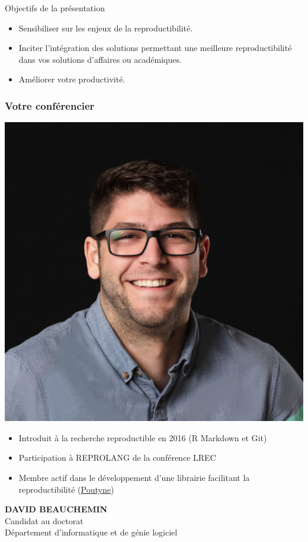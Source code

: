 \documentclass[aspectratio=169,10pt,xcolor=x11names,english,french]{beamer}
\begin{document}
	\begin{frame}{Objectifs de la présentation}
		\begin{itemize}
			\item Sensibiliser sur les enjeux de la reproductibilité.
			\item Inciter l'intégration des solutions permettant une meilleure reproductibilité dans vos solutions d'affaires ou académiques.
			\item Améliorer votre productivité.
		\end{itemize}
	\end{frame}
	
	\begin{frame}
		\frametitle{Votre conférencier}
		
		\begin{minipage}{0.25\linewidth}
			\includegraphics[width=\linewidth,keepaspectratio]{img/david}
		\end{minipage}
		\hfill
		\begin{minipage}{0.70\linewidth}
			\begin{itemize}
				\item Introduit à la recherche reproductible en 2016 (R Markdown et Git)
				\item Participation à REPROLANG de la conférence LREC \cite{garneau2020robust}
				\item Membre actif dans le développement d'une librairie facilitant la reproductibilité (\href{https://poutyne.org/}{Poutyne})
			\end{itemize}
		\end{minipage}
		
		\begin{minipage}{0.25\linewidth}
			\small
			\textbf{DAVID BEAUCHEMIN} \\
			Candidat au doctorat \\
			Département d'informatique et de génie logiciel
		\end{minipage}
	\end{frame}
	
\end{document}
